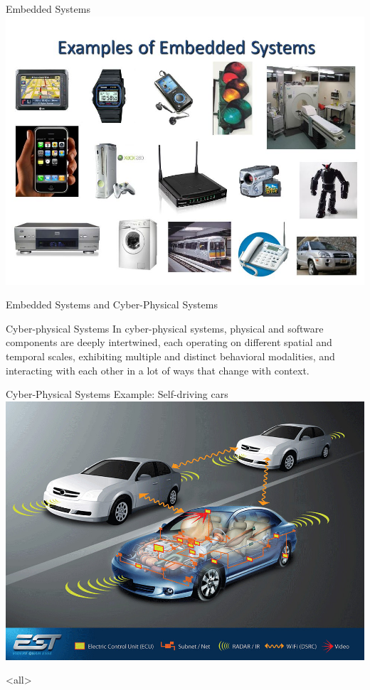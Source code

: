 \begin{frame}{Embedded Systems}
		\centering
		\includegraphics[width=\textwidth]{content/images/software-quality/Examples_of_Embedded_Systems}
		
\end{frame}

\begin{frame}{Embedded Systems and Cyber-Physical Systems}	

	\begin{block}{Cyber-physical Systems}
		In cyber-physical systems, physical and software components are deeply intertwined, each operating on different spatial and temporal scales, exhibiting multiple and distinct behavioral modalities, and interacting with each other in a lot of ways that change with context.
	\end{block}
	
\end{frame}



\begin{frame}{Cyber-Physical Systems}
	Example: Self-driving cars
	\centering
	\includegraphics[width=\textwidth]{content/images/software-quality/CPS_automotive}
	
\end{frame}







\exercises

\mode
<all>